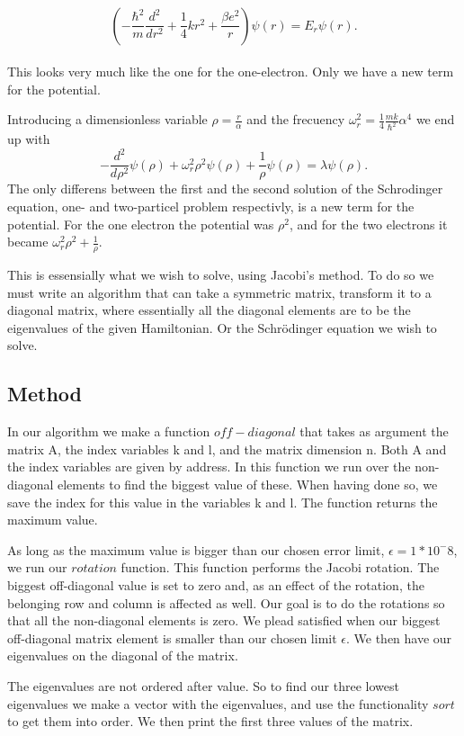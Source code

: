 \documentclass[a4paper,12pt, english]{article}
\begin{document}
\\
$$\left(  -\frac{\hbar^2}{m} \frac{d^2}{dr^2}+ \frac{1}{4}k r^2+\frac{\beta e^2}{r}\right)\psi(r)  = E_r \psi(r).$$
\\
This looks very much like the one for the one-electron. Only we have a new term for the potential.

Introducing a dimensionless variable $\rho = \frac{r}{\alpha}$ and the frecuency $\omega_r^2 = \frac{1}{4}\frac{mk}{\hbar^2}\alpha^4$ we end up with 
$$-\frac{d^2}{d\rho^2} \psi(\rho) + \omega_r^2\rho^2\psi(\rho) +\frac{1}{\rho}\psi(\rho) = \lambda \psi(\rho).$$
The only differens between the first and the second solution of the Schr\2odinger equation, one-  and two-particel problem respectivly, is a new term for the potential.
For the one electron the potential was $\rho^2$, and for the two electrons it became $\omega_r^2\rho^2 + \frac{1}{\rho}$.

This is essensially what we wish to solve, using Jacobi's method.
To do so we must write an algorithm that can take a symmetric matrix, transform it to a diagonal matrix, where essentially all the diagonal elements are to be the eigenvalues of the given Hamiltonian. Or the Schr\"odinger equation we wish to solve. 


\subsection{Method}
In our algorithm we make a function $off-diagonal$ that takes as argument the matrix A, the index variables k and l, and the matrix dimension n. Both A and the index variables are given by address. In this function we run over the non-diagonal elements to find the biggest value of these. When having done so, we save the index for this value in the variables k and l. The function returns the maximum value. 

As long as the maximum value is bigger than our chosen error limit, $\epsilon = 1*10^-8$, we run our $rotation$ function. This function performs the Jacobi rotation. The biggest off-diagonal value is set to zero and, as an effect of the rotation, the belonging row and column is affected as well. Our goal is to do the rotations so that all the non-diagonal elements is zero. We plead satisfied when our biggest off-diagonal matrix element is smaller than our chosen limit $\epsilon$. We then have our eigenvalues on the diagonal of the matrix.
 
The eigenvalues are not ordered after value. So to find our three lowest eigenvalues we make a vector with the eigenvalues, and use the functionality $sort$ to get them into order. We then print the first three values of the matrix.
 
\end{document}
